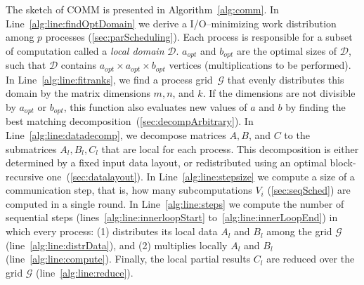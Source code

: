 \documentclass[sigplan,review,anonymous,10pt]{acmart}\settopmatter{printfolios=true,printccs=false,printacmref=false}
\newcommand\mac[1]{\textcolor{red}{[Mac: #1]}}
\begin{document}
The sketch of COMM is presented in Algorithm~\ref{alg:comm}.
In
Line~\ref{alg:line:findOptDomain} 
we derive a 
I/O--minimizing work distribution among $p$ 
processes (\cref{sec:parScheduling}). Each process is responsible for a subset 
of 
computation called a \emph{local domain} $\mathcal{D}$. $a_{opt}$ and 
$b_{opt}$ are the
optimal sizes of $\mathcal{D}$, such that $\mathcal{D}$ contains $a_{opt} 
\times a_{opt} 
\times b_{opt}$ vertices (multiplications to be performed).
 In 
Line~\ref{alg:line:fitranks}, we 
find a process
grid~$\mathcal{G}$ that evenly distributes this domain by the matrix dimensions 
$m,n$,
and $k$. If the dimensions are not divisible by $a_{opt}$ or $b_{opt}$, this
function also evaluates new values of $a$ and $b$ by finding the best matching
decomposition~(\cref{sec:decompArbitrary}).
In Line~\ref{alg:line:datadecomp}, 
we decompose matrices $A, B$, and $C$ to the submatrices $A_l, B_l, C_l$ that 
are 
local for 
each process.
This decomposition is either  
%
determined by a fixed input data layout, or redistributed using an optimal 
block-recursive
one~(\cref{sec:datalayout}). 
In Line~\ref{alg:line:stepsize} we compute a size of a 
communication step, that is, how many subcomputations $V_i$ 
(\cref{sec:seqSched}) are computed in a single round.
In Line~\ref{alg:line:steps} we 
compute the number of
sequential steps (lines~\ref{alg:line:innerloopStart}
to~\ref{alg:line:innerLoopEnd}) in which every process: (1) distributes its
local data $A_l$ and $B_l$  among the grid $\mathcal{G}$ 
(line~\ref{alg:line:distrData}),
and (2) multiplies locally $A_l$ and $B_l$
(line~\ref{alg:line:compute}). Finally, the local partial results $C_l$ are
reduced over the grid $\mathcal{G}$ (line~\ref{alg:line:reduce}).
\end{document}
